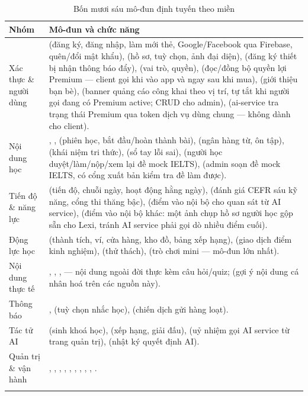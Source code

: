 \begin{longtable}{L{3.9cm} L{9.7cm}}
\toprule
\textbf{Nhóm} & \textbf{Mô-đun và chức năng}\\
\midrule
\endhead
Xác thực \& người dùng &  (đăng ký, đăng nhập, làm mới thẻ, Google/Facebook qua Firebase, quên/đổi mật khẩu),  (hồ sơ, tuỳ chọn, ảnh đại diện),  (đăng ký thiết bị nhận thông báo đẩy),  (vai trò, quyền),  (đọc/đồng bộ quyền lợi Premium — client gọi khi vào app và ngay sau khi mua),  (giới thiệu bạn bè),  (banner quảng cáo công khai theo vị trí, tự tắt khi người gọi đang có Premium active; CRUD cho admin),  (ai-service tra trạng thái Premium qua token dịch vụ dùng chung — không dành cho client).\\
Nội dung học & , ,  (phiên học, bắt đầu/hoàn thành bài),  (ngân hàng từ, ôn tập),  (khái niệm tri thức),  (sổ tay lỗi sai),  (người học duyệt/làm/nộp/xem lại đề mock IELTS),  (admin soạn đề mock IELTS, có cổng xuất bản kiểm tra đề làm được).\\
Tiến độ \& năng lực &  (tiến độ, chuỗi ngày, hoạt động hằng ngày),  (đánh giá CEFR sáu kỹ năng, cổng thi thăng bậc),  (điểm vào nội bộ cho quan sát từ AI service),  (điểm vào nội bộ khác: một ảnh chụp hồ sơ người học gộp sẵn cho Lexi, tránh AI service phải gọi dò nhiều điểm cuối).\\
Động lực học &  (thành tích, ví, cửa hàng, kho đồ, bảng xếp hạng),  (giao dịch điểm kinh nghiệm),  (thử thách),  (trò chơi mini — mô-đun lớn nhất).\\
Nội dung thực tế & , , ,  — nội dung ngoài đời thực kèm câu hỏi/quiz;  (gợi ý nội dung cá nhân hoá trên các nguồn này).\\
Thông báo & ,  (tuỳ chọn nhắc học),  (chiến dịch gửi hàng loạt).\\
Tác tử AI &  (sinh khoá học),  (xếp hạng, giải đấu),  (uỷ nhiệm gọi AI service từ trang quản trị),  (nhật ký quyết định AI).\\
Quản trị \& vận hành & , , , , , , , , , .\\
\bottomrule
\caption{Bốn mươi sáu mô-đun định tuyến theo miền}
\end{longtable}

